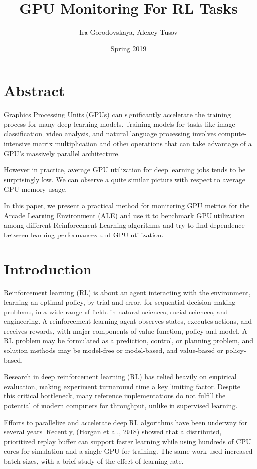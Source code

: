 \documentclass[11 pt, twocolumn]{article}
\title{GPU Monitoring For RL Tasks}
\author{Ira Gorodovskaya, Alexey Tusov}
\date{Spring 2019}
\begin{document}
\maketitle
\section{Abstract}
Graphics Processing Units (GPUs) can significantly accelerate the training process for many deep learning models. Training models for tasks like image classification, video analysis, and natural language processing involves compute-intensive matrix multiplication and other operations that can take advantage of a GPU's massively parallel architecture.

However in practice, average GPU utilization for deep learning jobs tends to be surprisingly low. We can observe a quite similar picture with respect to average GPU memory usage.

In this paper, we present a practical method for monitoring GPU metrics for the Arcade Learning Environment (ALE) and use it to benchmark GPU utilization among different Reinforcement Learning algorithms and try to find dependence between learning performances and GPU utilization.


\section{Introduction}
Reinforcement learning (RL) is about an agent interacting with the environment, learning an optimal
policy, by trial and error, for sequential decision making problems, in a wide range of fields in natural
sciences, social sciences, and engineering.
A reinforcement learning agent observes states, executes actions, and receives rewards, with
major components of value function, policy and model. A RL problem may be formulated as a
prediction, control, or planning problem, and solution methods may be model-free or model-based,
and value-based or policy-based.

Research in deep reinforcement learning (RL) has relied heavily on empirical evaluation, making experiment
turnaround time a key limiting factor. Despite this critical bottleneck, many reference implementations do not fulfill
the potential of modern computers for throughput, unlike in supervised learning.


Efforts to parallelize and accelerate deep RL algorithms have been underway for several years. Recently, (Horgan et al., 2018\cite{horgan2018distributed}) showed that a distributed, prioritized replay buffer can support faster
learning while using hundreds of CPU cores for simulation and a single GPU for training. The same work used
increased batch sizes, with a brief study of the effect of
learning rate.
\end{document}
